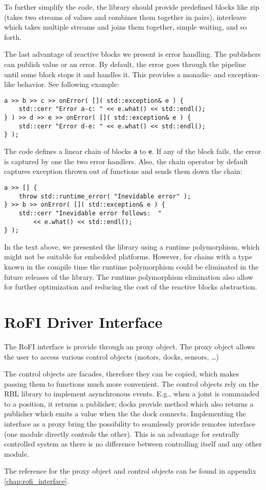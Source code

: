 To further simplify the code, the library should provide predefined blocks like
zip (takes two streams of values and combines them together in pairs),
interleave which takes multiple streams and joins them together, simple waiting,
and so forth.

The last advantage of reactive blocks we present is error handling. The
publishers can publish value or an error. By default, the error goes through the
pipeline until some block stops it and handles it. This provides a monadic- and
exception-like behavior. See following example:
\begin{verbatim}
a >> b >> c >> onError( []( std::exception& e ) {
    std::cerr "Error a-c: " << e.what() << std::endl();
} ) >> d >> e >> onError( []( std::exception& e ) {
    std::cerr "Error d-e: " << e.what() << std::endl();
} );
\end{verbatim}
The code defines a linear chain of blocks \texttt{a} to \texttt{e}. If any of
the block fails, the error is captured by one the two error handlers. Also, the
chain operator by default captures exception thrown out of functions and sends
them down the chain:
\begin{verbatim}
a >> [] {
    throw std::runtime_error( "Inevidable error" );
} >> b >> onError( []( std::exception& e ) {
    std::cerr "Inevidable error follows:  "
        << e.what() << std::endl();
} );
\end{verbatim}

In the text above, we presented the library using a runtime polymorphism, which
might not be suitable for embedded platforms. However, for chains with a type
known in the compile time the runtime polymorphism could be eliminated in the
future releases of the library. The runtime polymorphism elimination also allow
for further optimization and reducing the cost of the reactive blocks
abstraction.

\section{RoFI Driver Interface}

The RoFI interface is provide through an proxy object. The proxy object allows
the user to access various control objects (motors, docks, sensors, \ldots)

The control objects are facades, therefore they can be copied, which makes
passing them to functions much more convenient. The control objects rely on the
RBL library to implement asynchronous events. E.g., when a joint is commanded to
a position, it returns a publisher; docks provide method  which
also returns a publisher which emits a value when the the dock connects.
Implementing the interface as a proxy bring the possibility to seamlessly
provide remotes interface (one module directly controls the other). This is an
advantage for centrally controlled system as there is no difference between
controlling itself and any other module.

The reference for the proxy object and control objects can be found in appendix
\ref{chap:rofi_interface}.